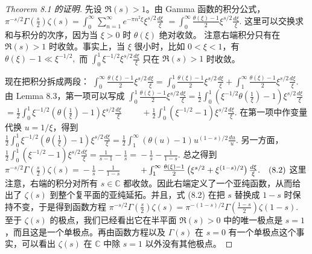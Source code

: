 
\begin{proof}[Theorem 8.1 的证明]
	先设 $\Re(s)>1$。由 Gamma 函数的积分公式，
	\(\textstyle \pi^{-s/2}\Gamma\left(\frac{s}{2}\right)\zeta(s) =\allowbreak{} \int_0^\infty \sum_{n=\allowbreak{}1}^{\infty}e^{-\pi n^2\xi} \xi^{s/2}\frac{d\xi}{\xi}\) \(\textstyle =\allowbreak{} \int_0^\infty \frac{\theta(\xi)-1}{2} \xi^{s/2}\frac{d\xi}{\xi}.\)
	这里可以交换求和与积分的次序，因为当 $\xi>0$ 时 $\theta(\xi)$ 绝对收敛。
	注意右端积分只有在 $\Re(s)>1$ 时收敛。事实上，当 $\xi$ 很小时，比如
	$0<\xi<1$，有
	\(\textstyle \theta(\xi)-1\ll\allowbreak{} \xi^{-1/2},\allowbreak{}\)
	而
	\(\textstyle \int_0^1 \xi^{-1/2}\xi^{s/2}\frac{d\xi}{\xi}\)
	只在 $\Re(s)>1$ 时收敛。

	现在把积分拆成两段：
	\(\textstyle \int_0^\infty \frac{\theta(\xi)-1}{2} \xi^{s/2}\frac{d\xi}{\xi} =\allowbreak{} \int_0^1 \frac{\theta(\xi)-1}{2} \xi^{s/2}\frac{d\xi}{\xi} +\allowbreak{} \int_1^\infty \frac{\theta(\xi)-1}{2} \xi^{s/2}\frac{d\xi}{\xi}.\)
	由 Lemma 8.3，第一项可以写成
	\(\textstyle \int_0^1 \frac{\theta(\xi)-1}{2} \xi^{s/2}\frac{d\xi}{\xi} =\allowbreak{} \frac12 \int_0^1 \left(\xi^{-1/2}\theta\left(\frac1\xi\right)-1\right) \xi^{s/2}\frac{d\xi}{\xi}\) \(\textstyle =\allowbreak{} \frac12 \int_0^1 \xi^{-1/2} \left(\theta\left(\frac1\xi\right)-1\right) \xi^{s/2}\frac{d\xi}{\xi}\) \(\textstyle \qquad +\allowbreak{} \frac12 \int_0^1 (\xi^{-1/2}-1)\xi^{s/2}\frac{d\xi}{\xi}.\)
	在第一项中作变量代换 $u=1/\xi$，得到
	\(\textstyle \frac12 \int_0^1 \xi^{-1/2} \left(\theta\left(\frac1\xi\right)-1\right) \xi^{s/2}\frac{d\xi}{\xi} =\allowbreak{} \frac12 \int_1^\infty (\theta(u)-1)u^{(1-s)/2}\frac{du}{u}.\)
	另一方面，
	\(\textstyle \frac12 \int_0^1 (\xi^{-1/2}-1)\xi^{s/2}\frac{d\xi}{\xi} =\allowbreak{} \frac{1}{s-1}-\frac1s =\allowbreak{} -\frac1s-\frac{1}{1-s}.\)
	总之得到
	\(\textstyle \pi^{-s/2}\Gamma\left(\frac{s}{2}\right)\zeta(s) =\allowbreak{} -\frac1s-\frac{1}{1-s}\) \(\textstyle \qquad +\allowbreak{} \int_1^\infty \frac{\theta(\xi)-1}{2} \left(\xi^{s/2}+\allowbreak{}\xi^{(1-s)/2}\right) \frac{d\xi}{\xi}. \quad\textup{(8.2)}\)
	这里注意，右端的积分对所有 $s\in\mathbb C$ 都收敛。因此右端定义了一个亚纯函数，从而给出了 $\zeta(s)$ 到整个复平面的亚纯延拓。并且，式 (8.2) 在把 $s$ 替换成 $1-s$ 时保持不变，于是得到函数方程
	\(\textstyle \pi^{-s/2}\Gamma\left(\frac{s}{2}\right)\zeta(s) =\allowbreak{} \pi^{-(1-s)/2} \Gamma\left(\frac{1-s}{2}\right)\zeta(1-s).\)
	至于 $\zeta(s)$ 的极点，我们已经看出它在半平面 $\Re(s)>0$ 中的唯一极点是 $s=1$，而且这是一个单极点。再由函数方程以及 $\Gamma(s)$ 在 $s=0$ 有一个单极点这个事实，可以看出 $\zeta(s)$ 在 $\mathbb C$ 中除 $s=1$ 以外没有其他极点。
\end{proof}

